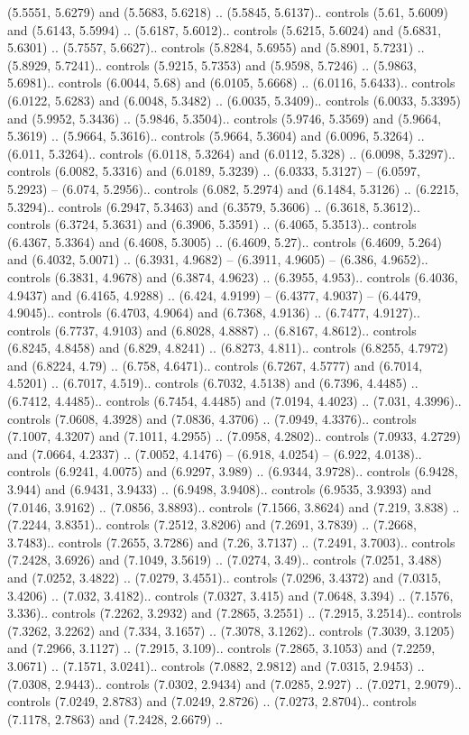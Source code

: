 (5.5551, 5.6279) and (5.5683, 5.6218) .. (5.5845, 5.6137).. controls (5.61, 5.6009) and (5.6143, 5.5994) .. (5.6187, 5.6012).. controls (5.6215, 5.6024) and (5.6831, 5.6301) .. (5.7557, 5.6627).. controls (5.8284, 5.6955) and (5.8901, 5.7231) .. (5.8929, 5.7241).. controls (5.9215, 5.7353) and (5.9598, 5.7246) .. (5.9863, 5.6981).. controls (6.0044, 5.68) and (6.0105, 5.6668) .. (6.0116, 5.6433).. controls (6.0122, 5.6283) and (6.0048, 5.3482) .. (6.0035, 5.3409).. controls (6.0033, 5.3395) and (5.9952, 5.3436) .. (5.9846, 5.3504).. controls (5.9746, 5.3569) and (5.9664, 5.3619) .. (5.9664, 5.3616).. controls (5.9664, 5.3604) and (6.0096, 5.3264) .. (6.011, 5.3264).. controls (6.0118, 5.3264) and (6.0112, 5.328) .. (6.0098, 5.3297).. controls (6.0082, 5.3316) and (6.0189, 5.3239) .. (6.0333, 5.3127) -- (6.0597, 5.2923) -- (6.074, 5.2956).. controls (6.082, 5.2974) and (6.1484, 5.3126) .. (6.2215, 5.3294).. controls (6.2947, 5.3463) and (6.3579, 5.3606) .. (6.3618, 5.3612).. controls (6.3724, 5.3631) and (6.3906, 5.3591) .. (6.4065, 5.3513).. controls (6.4367, 5.3364) and (6.4608, 5.3005) .. (6.4609, 5.27).. controls (6.4609, 5.264) and (6.4032, 5.0071) .. (6.3931, 4.9682) -- (6.3911, 4.9605) -- (6.386, 4.9652).. controls (6.3831, 4.9678) and (6.3874, 4.9623) .. (6.3955, 4.953).. controls (6.4036, 4.9437) and (6.4165, 4.9288) .. (6.424, 4.9199) -- (6.4377, 4.9037) -- (6.4479, 4.9045).. controls (6.4703, 4.9064) and (6.7368, 4.9136) .. (6.7477, 4.9127).. controls (6.7737, 4.9103) and (6.8028, 4.8887) .. (6.8167, 4.8612).. controls (6.8245, 4.8458) and (6.829, 4.8241) .. (6.8273, 4.811).. controls (6.8255, 4.7972) and (6.8224, 4.79) .. (6.758, 4.6471).. controls (6.7267, 4.5777) and (6.7014, 4.5201) .. (6.7017, 4.519).. controls (6.7032, 4.5138) and (6.7396, 4.4485) .. (6.7412, 4.4485).. controls (6.7454, 4.4485) and (7.0194, 4.4023) .. (7.031, 4.3996).. controls (7.0608, 4.3928) and (7.0836, 4.3706) .. (7.0949, 4.3376).. controls (7.1007, 4.3207) and (7.1011, 4.2955) .. (7.0958, 4.2802).. controls (7.0933, 4.2729) and (7.0664, 4.2337) .. (7.0052, 4.1476) -- (6.918, 4.0254) -- (6.922, 4.0138).. controls (6.9241, 4.0075) and (6.9297, 3.989) .. (6.9344, 3.9728).. controls (6.9428, 3.944) and (6.9431, 3.9433) .. (6.9498, 3.9408).. controls (6.9535, 3.9393) and (7.0146, 3.9162) .. (7.0856, 3.8893).. controls (7.1566, 3.8624) and (7.219, 3.838) .. (7.2244, 3.8351).. controls (7.2512, 3.8206) and (7.2691, 3.7839) .. (7.2668, 3.7483).. controls (7.2655, 3.7286) and (7.26, 3.7137) .. (7.2491, 3.7003).. controls (7.2428, 3.6926) and (7.1049, 3.5619) .. (7.0274, 3.49).. controls (7.0251, 3.488) and (7.0252, 3.4822) .. (7.0279, 3.4551).. controls (7.0296, 3.4372) and (7.0315, 3.4206) .. (7.032, 3.4182).. controls (7.0327, 3.415) and (7.0648, 3.394) .. (7.1576, 3.336).. controls (7.2262, 3.2932) and (7.2865, 3.2551) .. (7.2915, 3.2514).. controls (7.3262, 3.2262) and (7.334, 3.1657) .. (7.3078, 3.1262).. controls (7.3039, 3.1205) and (7.2966, 3.1127) .. (7.2915, 3.109).. controls (7.2865, 3.1053) and (7.2259, 3.0671) .. (7.1571, 3.0241).. controls (7.0882, 2.9812) and (7.0315, 2.9453) .. (7.0308, 2.9443).. controls (7.0302, 2.9434) and (7.0285, 2.927) .. (7.0271, 2.9079).. controls (7.0249, 2.8783) and (7.0249, 2.8726) .. (7.0273, 2.8704).. controls (7.1178, 2.7863) and (7.2428, 2.6679) .. 